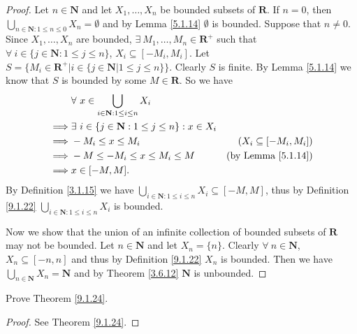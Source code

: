 \begin{proof}
    Let \(n \in \mathbf{N}\) and let \(X_1, \dots, X_n\) be bounded subsets of \(\mathbf{R}\).
    If \(n = 0\), then \(\bigcup_{n \in \mathbf{N} : 1 \leq n \leq 0} X_n = \emptyset\) and by Lemma \ref{5.1.14} \(\emptyset\) is bounded.
    Suppose that \(n \neq 0\).
    Since \(X_1, \dots, X_n\) are bounded, \(\exists\ M_1, \dots, M_n \in \mathbf{R}^+\) such that \(\forall\ i \in \{j \in \mathbf{N} : 1 \leq j \leq n\}\), \(X_i \subseteq [-M_i, M_i]\).
    Let \(S = \{M_i \in \mathbf{R}^+ | i \in \{j \in \mathbf{N} | 1 \leq j \leq n\}\}\).
    Clearly \(S\) is finite.
    By Lemma \ref{5.1.14} we know that \(S\) is bounded by some \(M \in \mathbf{R}\).
    So we have
    \begin{align*}
                 & \forall\ x \in \bigcup_{i \in \mathbf{N} : 1 \leq i \leq n} X_i                                    \\
        \implies & \exists\ i \in \{j \in \mathbf{N} : 1 \leq j \leq n\} : x \in X_i                                  \\
        \implies & -M_i \leq x \leq M_i                                              & (X_i \subseteq [-M_i, M_i])    \\
        \implies & -M \leq -M_i \leq x \leq M_i \leq M                               & \text{(by Lemma \ref{5.1.14})} \\
        \implies & x \in [-M, M].
    \end{align*}
    By Definition \ref{3.1.15} we have \(\bigcup_{i \in \mathbf{N} : 1 \leq i \leq n} X_i \subseteq [-M, M]\), thus by Definition \ref{9.1.22} \(\bigcup_{i \in \mathbf{N} : 1 \leq i \leq n} X_i\) is bounded.

    Now we show that the union of an infinite collection of bounded subsets of \(\mathbf{R}\) may not be bounded.
    Let \(n \in \mathbf{N}\) and let \(X_n = \{n\}\).
    Clearly \(\forall\ n \in \mathbf{N}\), \(X_n \subseteq [-n, n]\) and thus by Definition \ref{9.1.22} \(X_n\) is bounded.
    Then we have \(\bigcup_{n \in \mathbf{N}} X_n = \mathbf{N}\) and by Theorem \ref{3.6.12} \(\mathbf{N}\) is unbounded.
\end{proof}

\begin{exercise}\label{ex 9.1.13}
    Prove Theorem \ref{9.1.24}.
\end{exercise}

\begin{proof}
    See Theorem \ref{9.1.24}.
\end{proof}

